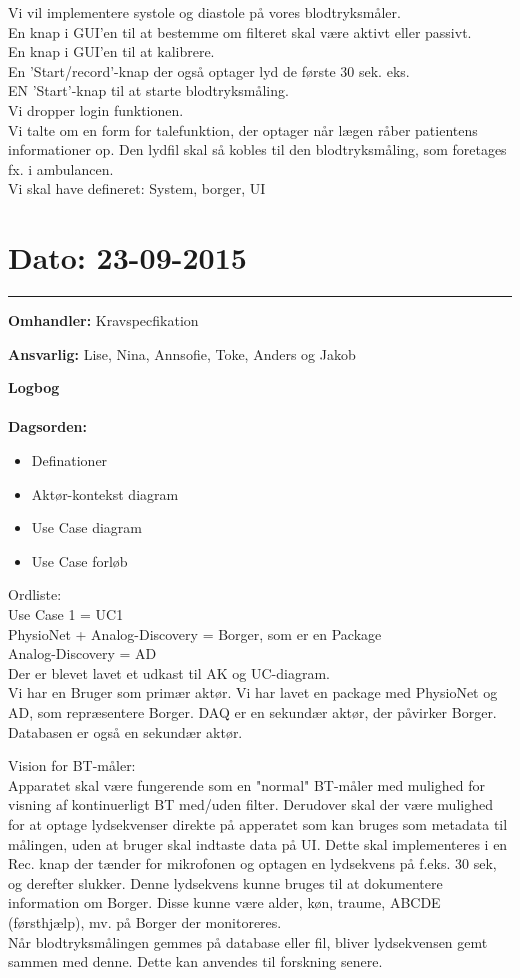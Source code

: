 Vi vil implementere systole og diastole på vores blodtryksmåler.\\
En knap i GUI'en til at bestemme om filteret skal være aktivt eller passivt.\\
En knap i GUI'en til at kalibrere.\\
En 'Start/record'-knap der også optager lyd de første 30 sek. eks.\\
EN 'Start'-knap til at starte blodtryksmåling.\\
Vi dropper login funktionen.\\
Vi talte om en form for talefunktion, der optager når lægen råber patientens informationer op. Den lydfil skal så kobles til den blodtryksmåling, som foretages fx. i ambulancen. \\
Vi skal have defineret: System, borger, UI




\section{Dato: 23-09-2015 }
\hrule

\textbf{Omhandler:} Kravspecfikation 

\textbf{Ansvarlig:} Lise, Nina, Annsofie, Toke, Anders og Jakob

\textbf{Logbog}
\\
\\
\textbf{Dagsorden:}
\begin{itemize}
	\item Definationer
	\item Aktør-kontekst diagram
	\item Use Case diagram
	\item Use Case forløb
\end{itemize}

Ordliste:\\ 
Use Case 1 = UC1 \\
PhysioNet + Analog-Discovery = Borger, som er en Package \\
Analog-Discovery = AD \\

Der er blevet lavet et udkast til AK og UC-diagram. \\
Vi har en Bruger som primær aktør. Vi har lavet en package med PhysioNet og AD, som repræsentere Borger. DAQ er en sekundær aktør, der påvirker Borger. Databasen er også en sekundær aktør. 

Vision for BT-måler:\\
Apparatet skal være fungerende som en "normal" BT-måler med mulighed for visning af kontinuerligt BT med/uden filter. Derudover skal der være mulighed for at optage lydsekvenser direkte på apperatet som kan bruges som metadata til målingen, uden at bruger skal indtaste data på UI. Dette skal implementeres i en Rec. knap der tænder for mikrofonen og optagen en lydsekvens på f.eks. 30 sek, og derefter slukker. Denne lydsekvens kunne bruges til at dokumentere information om Borger. Disse kunne være alder, køn, traume, ABCDE (førsthjælp), mv. på Borger der monitoreres. \\
Når blodtryksmålingen gemmes på database eller fil, bliver lydsekvensen gemt sammen med denne. Dette kan anvendes til forskning senere. 

